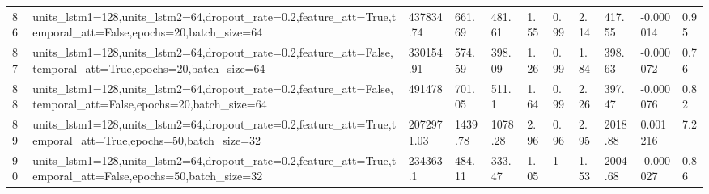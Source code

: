 \begin{longtable}{C{0.8cm} L{2cm} C{1.15cm} C{1.15cm} C{1.15cm} C{1.15cm} C{0.85cm} C{1.25cm} C{1.2cm} C{1.5cm} C{1.0cm}}
86 & units\_lstm1=128,\newline units\_lstm2=64,\newline dropout\_rate=0.2,\newline feature\_att=True,\newline temporal\_att=False,\newline epochs=20,\newline batch\_size=64 & 437834.74 & 661.69 & 481.61 & 1.55 & 0.99 & 2.14 & 417.55 & -0.000014 & 0.95 \\
87 & units\_lstm1=128,\newline units\_lstm2=64,\newline dropout\_rate=0.2,\newline feature\_att=False,\newline temporal\_att=True,\newline epochs=20,\newline batch\_size=64 & 330154.91 & 574.59 & 398.09 & 1.26 & 0.99 & 1.84 & 398.63 & -0.000072 & 0.76 \\
88 & units\_lstm1=128,\newline units\_lstm2=64,\newline dropout\_rate=0.2,\newline feature\_att=False,\newline temporal\_att=False,\newline epochs=20,\newline batch\_size=64 & 491478 & 701.05 & 511.1 & 1.64 & 0.99 & 2.26 & 397.47 & -0.000076 & 0.82 \\
89 & units\_lstm1=128,\newline units\_lstm2=64,\newline dropout\_rate=0.2,\newline feature\_att=True,\newline temporal\_att=True,\newline epochs=50,\newline batch\_size=32 & 2072971.03 & 1439.78 & 1078.28 & 2.96 & 0.96 & 2.95 & 2018.88 & 0.001216 & 7.2 \\
90 & units\_lstm1=128,\newline units\_lstm2=64,\newline dropout\_rate=0.2,\newline feature\_att=True,\newline temporal\_att=False,\newline epochs=50,\newline batch\_size=32 & 234363.1 & 484.11 & 333.47 & 1.05 & 1 & 1.53 & 2004.68 & -0.000027 & 0.86 \\

\end{longtable}
